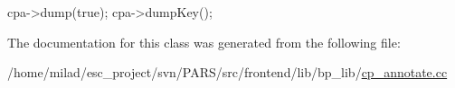 \begin{DoxyCode}
{
    cpa->dump(true);
    cpa->dumpKey();
}
\end{DoxyCode}


The documentation for this class was generated from the following file:\begin{DoxyCompactItemize}
\item 
/home/milad/esc\_\-project/svn/PARS/src/frontend/lib/bp\_\-lib/\hyperlink{cp__annotate_8cc}{cp\_\-annotate.cc}\end{DoxyCompactItemize}
